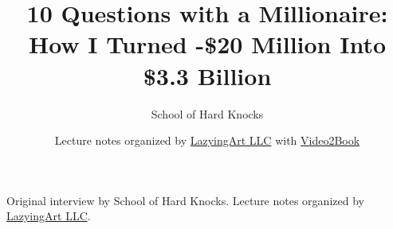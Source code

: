 \documentclass[11pt,oneside]{book}
\begin{document}
\frontmatter
\title{10 Questions with a Millionaire: How I Turned -\$20 Million Into \$3.3 Billion}
\author{School of Hard Knocks}
\date{Lecture notes organized by \href{https://lazying.art}{LazyingArt LLC} with \href{https://github.com/lachlanchen/Video2Book}{Video2Book}}
\maketitle
\begin{center}
\small Original interview by School of Hard Knocks. Lecture notes organized by \href{https://lazying.art}{LazyingArt LLC}.
\end{center}
\clearpage
\mainmatter

\end{document}
